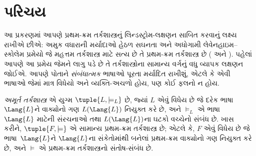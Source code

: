 \OLEndChapterHook
\endgroup


\begingroup
\makeatletter{}\makeatother

\label{guunit:OLP-0203}


\begingroup
\makeatletter{}\makeatother

\section{પરિચય}
\label{guunit:OLP-0204}


આ પ્રકરણમાં આપણે પ્રથમ-ક્રમ તર્કશાસ્ત્રનું લિન્ડસ્ટ્રોમ-લક્ષણન સાબિત
કરવાનું લક્ષ્ય રાખીએ છીએ: અમુક વધારાની મર્યાદાઓ હેઠળ સઘનતા અને અધોગામી
લેવેનહાઇમ--સ્કોલેમ પ્રમેયો જે મહત્તમ તર્કશાસ્ત્ર માટે સત્ય છે તે
પ્રથમ-ક્રમ તર્કશાસ્ત્ર છે
( અને
). પહેલાં આપણે આ પ્રમેય જેમને લાગુ
પડે છે તે તર્કશાસ્ત્રોના સામાન્ય વર્ગનું વધુ વ્યાપક લક્ષણન જોઈએ. આપણે
પોતાને \emph{સંબંધાત્મક} ભાષાઓ પૂરતા મર્યાદિત રાખીશું, એટલે કે એવી
ભાષાઓ જેમાં માત્ર વિધેયો અને વ્યક્તિ-અચળો હોય, પણ કોઈ
ફલનો ન હોય.
\endgroup


\begingroup
\makeatletter{}\makeatother

\label{guunit:OLP-0205}


\begin{defn}
  \emph{અમૂર્ત તર્કશાસ્ત્ર} એ યુગ્મ $\tuple{L, \models_L}$ છે, જ્યાં
  $L$ એવું વિધેય છે જે દરેક ભાષા~$\Lang{L}$ને
  વાક્યોનો ગણ $L(\Lang{L})$ નિયુક્ત કરે છે, અને $\models_L$ એ
  ભાષા~$\Lang{L}$ માટેની સંરચનાઓ તથા $L(\Lang{L})$ના
  ઘટકો વચ્ચેનો સંબંધ છે. ખાસ કરીને, $\tuple{F, \models}$ એ
  સામાન્ય પ્રથમ-ક્રમ તર્કશાસ્ત્ર છે; એટલે કે, $F$ એવું વિધેય છે જે
  ભાષા~$\Lang{L}$ને $\Lang{L}$ના સંકેતોમાંથી બનેલાં પ્રથમ-ક્રમ
  વાક્યોનો ગણ નિયુક્ત કરે છે, અને $\models$ એ પ્રથમ-ક્રમ
  તર્કશાસ્ત્રનો સંતોષ-સંબંધ છે.
\end{defn}

